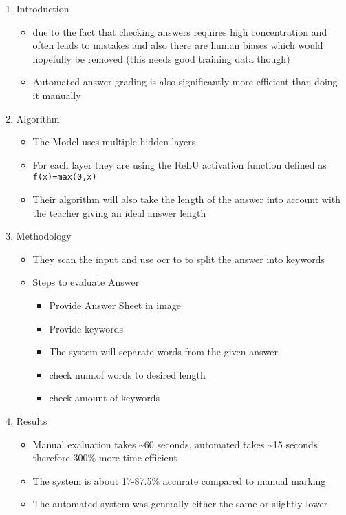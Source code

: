 \documentclass[11pt]{article}
\begin{document}
\begin{enumerate}
\item Introduction
\label{sec:orgc9af748}
\begin{itemize}
\item due to the fact that checking answers requires high concentration and often leads to mistakes and also there are human biases which would hopefully be removed (this needs good training data though)
\item Automated answer grading is also significantly more efficient than doing it manually
\end{itemize}
\item Algorithm
\label{sec:orga507f99}
\begin{itemize}
\item The Model uses multiple hidden layers
\item For each layer they are using the ReLU activation function defined as \texttt{f(x)=max(0,x)}
\item Their algorithm will also take the length of the answer into account with the teacher giving an ideal answer length
\end{itemize}
\item Methodology
\label{sec:orgd19b380}
\begin{itemize}
\item They scan the input and use ocr to to split the answer into keywords
\item Steps to evaluate Answer
\begin{itemize}
\item Provide Answer Sheet in image
\item Provide keywords
\item The system will separate words from the given answer
\item check num.of words to desired length
\item check amount of keywords
\end{itemize}
\end{itemize}
\item Results
\label{sec:org6ace07a}
\begin{itemize}
\item Manual exaluation takes \textasciitilde{}60 seconds, automated takes \textasciitilde{}15 seconds therefore 300\% more time efficient
\item The system is about 17-87.5\% accurate compared to manual marking
\item The automated system was generally either the same or slightly lower
\end{itemize}
\end{enumerate}
\end{document}
